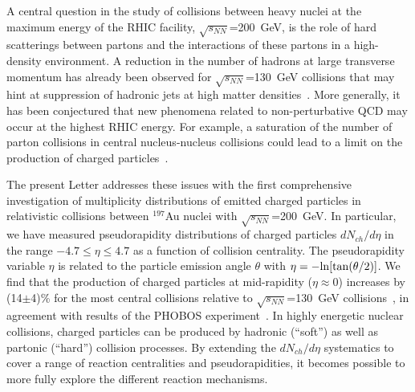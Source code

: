 \documentclass[preprint,showpacs,preprintnumbers,amsmath,amssymb]{revtex4}
\begin{document}
\begin{abstract}
  We present charged-particle multiplicities as a function of
  pseudorapidity and collision centrality for the
  $^{197}$Au+$^{197}$Au reaction at $\sqrt{s_{NN}}$=200~GeV.  For the
  5\% most central events we obtain 
  $dN_{ch}/d\eta|_{\eta = 0}$ = 625$\pm$55
  and 
  $N_{ch} |_{-4.7\le \eta \le 4.7} =  4630\pm 370$,  i.e.
  14\% and 21\% increases, respectively,  
  relative to $\sqrt{s_{NN}}$=130~GeV collisions.  Charged-particle 
  production per pair of participant nucleons is found
  to increase from peripheral 
  to central collisions around mid-rapidity.  These results
  constrain current models of particle production at the highest
  RHIC energy.
\end{abstract}
\maketitle

A central question in the study of collisions between heavy nuclei at
the maximum energy of the RHIC facility,
$\sqrt{s_{NN}}$=200~GeV, is the role of hard scatterings between
partons and the interactions of these partons in a high-density
environment. A reduction in the number of hadrons at large
transverse momentum has 
already been observed for $\sqrt{s_{NN}}$=130~GeV collisions 
that may hint at suppression of hadronic jets at high matter
densities~\cite{Phenix-jets,Star-jets}.
More generally, it has been conjectured that new phenomena
related to non-perturbative QCD may occur at the
highest RHIC energy. For example, a 
saturation of the number of parton
collisions in central nucleus-nucleus collisions could lead to a
limit on the  production of charged
particles~\cite{partonsat83,Eskola00,Kharzeev_and_Levin}.  

The present Letter addresses these issues with the first comprehensive
investigation of multiplicity distributions of emitted charged
particles in relativistic collisions between $^{197}$Au
nuclei with $\sqrt{s_{NN}}$=200~GeV. In particular, we have measured
pseudorapidity distributions of charged particles 
$dN_{ch}/d\eta$ in the range $-4.7 \le \eta \le 4.7$  
as a function of collision
centrality.  The pseudorapidity variable $\eta$ is related to the particle
emission angle $\theta$ with $\eta=-{\rm ln}[{\rm tan}(\theta/2)]$.
We find that the
production of charged particles at mid-rapidity ($\eta \approx 0$) 
increases by  (14$\pm$4)\%
for the most central collisions relative to $\sqrt{s_{NN}}$=130~GeV
collisions~\cite{back00,Star-mult130,adcox01,bearden01a}, in agreement 
with results of the PHOBOS experiment~\cite{Phobos-mult200-1}.
In highly
energetic nuclear collisions, charged particles can 
be produced by hadronic (``soft'') as well as
partonic (``hard'') collision processes. By extending the 
$dN_{ch}/d\eta$ systematics to cover a range of reaction centralities
and pseudorapidities, it becomes possible to more fully explore the
different reaction mechanisms.
  
\end{document}
